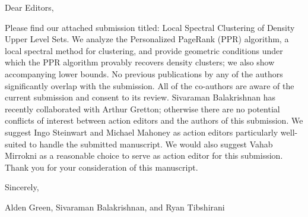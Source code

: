 \documentclass{article}
\begin{document}
Dear Editors, 

\vspace{.2 in}

Please find our attached submission titled: Local Spectral Clustering of Density Upper Level Sets. We analyze the Personalized PageRank (PPR) algorithm, a local spectral method for clustering, and provide geometric conditions under which the PPR algorithm provably recovers density clusters; we also show accompanying lower bounds. No previous publications by any of the authors significantly overlap with the submission. All of the co-authors are aware of the current submission and consent to its review. Sivaraman Balakrishnan has recently collaborated with Arthur Gretton; otherwise there are no potential conflicts of interest between action editors and the authors of this submission. We suggest Ingo Steinwart and Michael Mahoney as action editors particularly well-suited to handle the submitted manuscript. We would also suggest Vahab Mirrokni as a reasonable choice to serve as action editor for this submission. Thank you for your consideration of this manuscript.

\vspace{.2 in}

Sincerely,

\vspace{.1 in}
Alden Green, Sivaraman Balakrishnan, and Ryan Tibshirani
	
	
	
\end{document}
